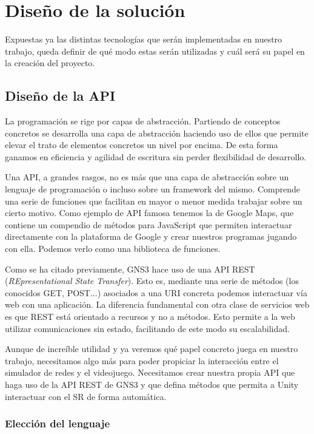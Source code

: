 \chapter{Diseño de la solución}\label{chap:Design}

Expuestas ya las distintas tecnologías que serán implementadas en nuestro trabajo, queda definir de qué modo estas serán utilizadas y cuál será su papel en la creación del proyecto.

\section{Diseño de la API}
La programación se rige por capas de abstracción. Partiendo de conceptos concretos se desarrolla una capa de abstracción haciendo uso de ellos que permite elevar el trato de elementos concretos un nivel por encima\cite{abstraction}. De esta forma ganamos en eficiencia y agilidad de escritura sin perder flexibilidad de desarrollo.

Una API, a grandes rasgos, no es más que una capa de abstracción sobre un lenguaje de programación o incluso sobre un framework del mismo. Comprende una serie de funciones que facilitan en mayor o menor medida trabajar sobre un cierto motivo. Como ejemplo de API famosa tenemos la de Google Maps, que contiene un compendio de métodos para JavaScript que permiten interactuar directamente con la plataforma de Google y crear nuestros programas jugando con ella\cite{googlemaps}. Podemos verlo como una biblioteca de funciones.

Como se ha citado previamente, GNS3 hace uso de una API REST (\textit{REpresentational State Transfer}). Esto es, mediante una serie de métodos (los conocidos GET, POST...) asociados a una URI concreta podemos interactuar vía web con una aplicación. La diferencia fundamental con otra clase de servicios web es que REST está orientado a recursos y no a métodos. Esto permite a la web utilizar comunicaciones sin estado, facilitando de este modo su escalabilidad\cite{REST}.

Aunque de increíble utilidad y ya veremos qué papel concreto juega en nuestro trabajo, necesitamos algo más para poder propiciar la interacción entre el simulador de redes y el videojuego. Necesitamos crear nuestra propia API que haga uso de la API REST de GNS3 y que defina métodos que permita a Unity interactuar con el SR de forma automática.

\subsection{Elección del lenguaje}

